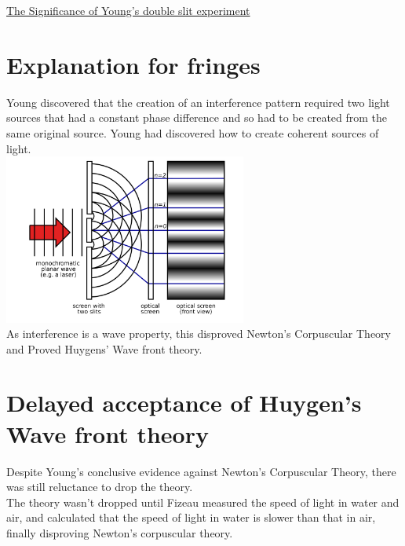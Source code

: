 \documentclass[12pt]{article}
\begin{document}
\begin{center}
\underline{\huge The Significance of Young’s double slit experiment}
\end{center}
\section{Explanation for fringes}
Young discovered that the creation of an interference pattern required two light sources that had a constant phase difference and so had to be created from the same original source. Young had discovered how to create coherent sources of light.\\
\includegraphics[width=8cm]{double_slit.png}\\
As interference is a wave property, this disproved Newton's Corpuscular Theory and Proved Huygens' Wave front theory.
\section{Delayed acceptance of Huygen's  Wave front theory}
Despite Young's conclusive evidence against Newton's Corpuscular Theory, there was still reluctance to drop the theory.\\
The theory wasn't dropped until Fizeau measured the speed of light in water and air, and calculated that the speed of light in water is slower than that in air, finally disproving Newton's corpuscular theory.
\end{document}
